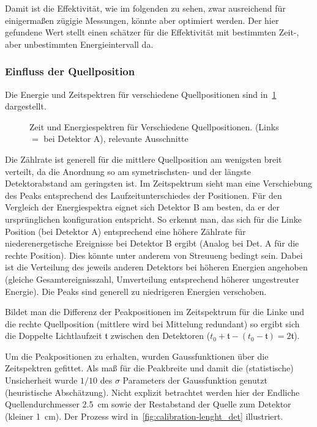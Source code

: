 \documentclass[slug=PET, room=Andreas-Schubert-Bau\,\ 424A, supervisor=Carsten\ Bittrich, coursedate=10.\ 01.\ 2020]{../../Lab_Report_LaTeX/lab_report}
\begin{document}
Damit ist die Effektivit\"at, wie im folgenden zu sehen, zwar
ausreichend f\"ur einigerma\ss{}en z\"ugigie Messungen, k\"onnte aber
optimiert werden. Der hier gefundene Wert stellt einen sch\"atzer
f\"ur die Effektivit\"at mit bestimmten Zeit-, aber unbestimmten
Energieintervall da.


\subsubsection{Einfluss der Quellposition}
\label{sec:quellpos}

Die Energie und Zeitspektren f\"ur verschiedene Quellpositionen sind
in~\ref{fig:calibration-comp} dargestellt.
\begin{figure}[H]\centering
  
  \caption[Vergleich der Quellpositionen]{Zeit und Energiespektren f\"ur Verschiedene
    Quellpositionen. (Links \(=\) bei Detektor A), relevante Ausschnitte}
  \label{fig:calibration-comp}
\end{figure}

Die Z\"ahlrate ist generell f\"ur die mittlere Quellposition am
wenigsten breit verteilt, da die Anordnung so am symetrischsten- und
der l\"angste Detektorabstand am geringsten ist. Im Zeitspektrum sieht
man eine Verschiebung des Peaks entsprechend des Laufzeitunterschiedes
der Positionen. F\"ur den Vergleich der Energiespektra eignet sich
Detektor B am besten, da er der urspr\"unglichen konfiguration
entspricht. So erkennt man, das sich f\"ur die Linke Position (bei
Detektor A) entsprechend eine h\"ohere Z\"ahlrate f\"ur
niederenergetische Ereignisse bei Detektor B ergibt (Analog bei Det. A
f\"ur die rechte Position). Dies k\"onnte unter anderem von Streuueng
bedingt sein. Dabei ist die Verteilung des jeweils anderen Detektors
bei h\"oheren Energien angehoben (gleiche Gesamtereignisszahl,
Umverteilung entsprechend h\"oherer ungestreuter Energie).  Die Peaks
sind generell zu niedrigeren Energien verschoben.

Bildet man die Differenz der Peakpositionen im Zeitspektrum f\"ur die
Linke und die rechte Quellposition (mittlere wird bei Mittelung
redundant) so ergibt sich die Doppelte Lichtlaufzeit \(\mathfrak{t}\)
zwischen den Detektoren
(\(t_0 + \mathfrak{t} - (t_0 - \mathfrak{t}) = 2\mathfrak{t}\)).

Um die Peakpositionen zu erhalten, wurden Gaussfunktionen \"uber die
Zeitspektren gefittet. Als ma\ss{} f\"ur die Peakbreite und damit die
(statistische) Unsicherheit wurde \(1/10\) des \(\sigma\) Parameters
der Gaussfunktion genutzt (heuristische Absch\"atzung). Nicht explizit
betrachtet werden hier der Endliche Quellendurchmesser
\SI{2.5}{\centi\meter} sowie der Restabstand der Quelle zum Detektor
(kleiner \SI{1}{\centi\meter}). Der Prozess wird
in~\ref{fig:calibration-lenght_det} illustriert.
\end{document}
